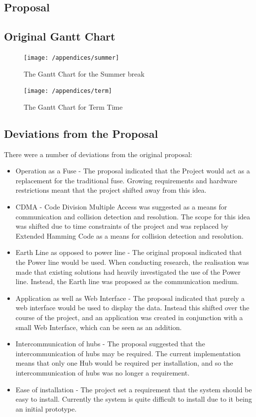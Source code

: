 \documentclass[preprint,12pt,3p]{elsarticle}
\begin{document}
\clearpage
\begin{appendices}
\subsection{Proposal}

\subsection{Original Gantt Chart}
\begin{figure}[H]
    \centering
    \texttt{[image: /appendices/summer]}
    \caption{The Gantt Chart for the Summer break}
    \label{fig:summergantt}
\end{figure}
\begin{figure}[H]
    \centering
    \texttt{[image: /appendices/term]}
    \caption{The Gantt Chart for Term Time}
    \label{fig:termgantt}
\end{figure}
\clearpage
\subsection{Deviations from the Proposal}
There were a number of deviations from the original proposal:
\begin{itemize}
\item Operation as a Fuse - The proposal indicated that the Project would act as a replacement for the traditional fuse. Growing requirements and hardware restrictions meant that the project shifted away from this idea.
\item CDMA - Code Division Multiple Access was suggested as a means for communication and collision detection and resolution. The scope for this idea was shifted due to time constraints of the project and was replaced by Extended Hamming Code as a means for collision detection and resolution.
\item Earth Line as opposed to power line - The original proposal indicated that the Power line would be used. When conducting research, the realisation was made that existing solutions had heavily investigated the use of the Power line. Instead, the Earth line was proposed as the communication medium.
\item Application as well as Web Interface - The proposal indicated that purely a web interface would be used to display the data. Instead this shifted over the course of the project, and an application was created in conjunction with a small Web Interface, which can be seen as an addition.
\item Intercommunication of hubs - The proposal suggested that the intercommunication of hubs may be required. The current implementation means that only one Hub would be required per installation, and so the intercommunication of hubs was no longer a requirement.
\item Ease of installation - The project set a requirement that the system should be easy to install. Currently the system is quite difficult to install due to it being an initial prototype.
\end{itemize}


\end{appendices}
\end{document}

